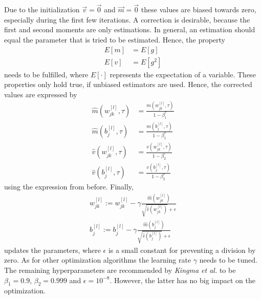 Due to the initialization $\vec{v} = \vec{0}$ and $\vec{m} = \vec{0}$ these values are biased towards zero, especially during the first few iterations.
A correction is desirable, because the first and second moments are only estimations.
In general, an estimation should equal the parameter that is tried to be estimated.
Hence, the property
\begin{subequations}
	\begin{align}
		E[m] &= E[g]\\
		E[v] &= E[g^2]
	\end{align}
\end{subequations}
needs to be fulfilled, where $E[\cdot]$ represents the expectation of a variable.
These properties only hold true, if unbiased estimators are used.
Hence, the corrected values are expressed by
\begin{subequations}
	\label{eq:adam-corrected}
	\begin{align}
	\hat{m}(w^{[l]}_{jk}, \tau) &= \frac{m(w^{[l]}_{jk},\tau)}{1-\beta_1^\tau} \\
	\hat{m}(b^{[l]}_{j}, \tau) &= \frac{m(b^{[l]}_{j},\tau)}{1-\beta_1^\tau} \\
	\hat{v}(w^{[l]}_{jk}, \tau) &= \frac{v(w^{[l]}_{jk}, \tau)}{1-\beta_2^\tau} \\
	\hat{v}(b^{[l]}_{j}, \tau) &= \frac{v(b^{[l]}_{j}, \tau)}{1-\beta_2^\tau}
	\end{align}
\end{subequations}
using the expression from before.
Finally,
\begin{subequations}
	\label{eq:adam-update}
	\begin{align}
		w^{[l]}_{jk} := w^{[l]}_{jk}-\gamma \frac{\hat{m}(w^{[l]}_{jk})}{\sqrt{\hat{v}(w^{[l]}_{jk})} + \epsilon} \\
		b^{[l]}_{j} := b^{[l]}_{j}-\gamma \frac{\hat{m}(b^{[l]}_{j})}{\sqrt{\hat{v}(b^{[l]}_{j})} + \epsilon}
	\end{align}
\end{subequations}
updates the parameters, where $\epsilon$ is a small constant for preventing a division by zero.
As for other optimization algorithms the learning rate $\gamma$ needs to be tuned.
The remaining hyperparameters are recommended by \textit{Kingma et al.} to be $\beta_1 = 0.9$, $\beta_2 = 0.999$ and $\epsilon = 10^{-8}$.
However, the latter has no big impact on the optimization.